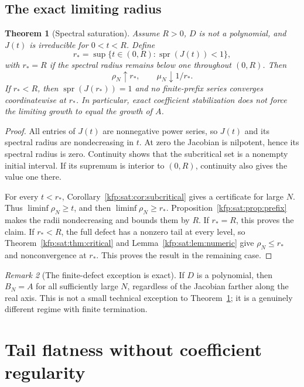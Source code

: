 \documentclass[11pt,a4paper]{article}
\newtheorem{theorem}{Theorem}[section]
\theoremstyle{definition}
\theoremstyle{remark}
\newtheorem{remark}[theorem]{Remark}
\newcommand{\spr}{\operatorname{spr}}
\begin{document}
\subsection{The exact limiting radius}
\begin{theorem}[Spectral saturation]\label{kfp:sat:thm:limit}
Assume $R>0$, $D$ is not a polynomial, and $J(t)$ is irreducible for
$0<t<R$. Define
\begin{equation}\label{kfp:sat:eq:barrier}
 r_* = \sup\{t\in(0,R):\spr(J(t))<1\},
\end{equation}
with $r_*=R$ if the spectral radius remains below one throughout $(0,R)$.
Then
\begin{equation}\label{kfp:sat:eq:radius-limit}
 \rho_N\uparrow r_*,\qquad \mu_N\downarrow1/r_*.
\end{equation}
If $r_*<R$, then $\spr(J(r_*))=1$ and no finite-prefix series converges
coordinatewise at $r_*$. In particular, exact coefficient stabilization
does not force the limiting growth to equal the growth of $A$.
\end{theorem}
\begin{proof}
All entries of $J(t)$ are nonnegative power series, so $J(t)$ and its
spectral radius are nondecreasing in $t$. At zero the Jacobian is
nilpotent, hence its spectral radius is zero. Continuity shows that the
subcritical set is a nonempty initial interval. If its supremum is
interior to $(0,R)$, continuity also gives the value one there.

For every $t<r_*$, Corollary~\ref{kfp:sat:cor:subcritical} gives a certificate for
large $N$. Thus $\liminf\rho_N\ge t$, and then
$\liminf\rho_N\ge r_*$. Proposition~\ref{kfp:sat:prop:prefix} makes the radii
nondecreasing and bounds them by $R$. If $r_*=R$, this proves the claim.
If $r_*<R$, the full defect has a nonzero tail at every level, so
Theorem~\ref{kfp:sat:thm:critical} and Lemma~\ref{kfp:sat:lem:numeric} give
$\rho_N\le r_*$ and nonconvergence at $r_*$. This proves the result in
the remaining case.
\end{proof}

\begin{remark}[The finite-defect exception is exact]
If $D$ is a polynomial, then $B_N=A$ for all sufficiently large $N$,
regardless of the Jacobian farther along the real axis. This is not a
small technical exception to Theorem~\ref{kfp:sat:thm:limit}; it is a genuinely
different regime with finite termination.
\end{remark}

\section{Tail flatness without coefficient regularity}
\label{kfp:sat:sec:tails}
\end{document}
